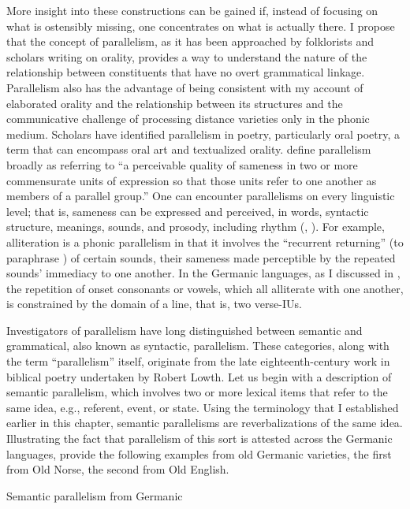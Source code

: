More insight into these constructions can be gained if, instead of focusing on what is ostensibly missing, one concentrates on what is actually there. I propose that the concept of parallelism, as it has been approached by folklorists and scholars writing on orality, provides a way to understand the nature of the relationship between constituents that have no overt grammatical linkage. Parallelism also has the advantage of being consistent with my account of elaborated orality and the relationship between its structures and the communicative challenge of processing distance varieties only in the phonic medium. Scholars have identified parallelism in poetry, particularly oral poetry, a term that can encompass oral art and textualized orality. \citet[206]{FrogTarkka2017} define parallelism broadly as referring to “a perceivable quality of sameness in two or more commensurate units of expression so that those units refer to one another as members of a parallel group.” One can encounter parallelisms on every linguistic level; that is, sameness can be expressed and perceived, in words, syntactic structure, meanings, sounds, and prosody, including rhythm (\citealt{FrogTarkka2017}, \citealt{Jakobson1966}). For example, alliteration is a phonic parallelism in that it involves the “recurrent returning” (to paraphrase \citealt[399]{Jakobson1966}) of certain sounds, their sameness made perceptible by the repeated sounds’ immediacy to one another. In the Germanic languages, as I discussed in , the repetition of onset consonants or vowels, which all alliterate with one another, is constrained by the domain of a line, that is, two verse-IUs.

Investigators of parallelism have long distinguished between semantic and grammatical, also known as syntactic, parallelism. These categories, along with the term “parallelism” itself, originate from the late eighteenth-century work in biblical poetry undertaken by Robert Lowth. Let us begin with a description of semantic parallelism, which involves two or more lexical items that refer to the same idea, e.g., referent, event, or state. Using the terminology that I established earlier in this chapter, semantic parallelisms are reverbalizations of the same idea. Illustrating the fact that parallelism of this sort is attested across the Germanic languages, \citet[207; 212]{FrogTarkka2017} provide the following examples from old Germanic varieties, the first from Old Norse, the second from Old English.

\ea%
    \label{ex:6:25}
  Semantic parallelism from Germanic\\

